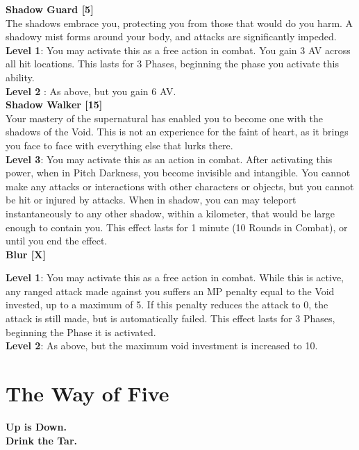 \documentclass[a4paper, twocolumn, openany]{book}
\newlength{\indentlen}
\newcommand{\tabto}[1]{\setlength{\leftskip}{#1\indentlen}}
\begin{document}
{\tabto{0}
{\bfseries\large Shadow Guard [5]\\}
The shadows embrace you, protecting you from those that would do you harm. A shadowy mist
forms around your body, and attacks are significantly impeded.\\

	\tabto{1}
	{\bfseries Level 1}: You may activate this as a free action in combat. You gain 3 AV across all hit
	locations. This lasts for 3 Phases, beginning the phase you activate this ability.\\

		\tabto{2}
		{\bfseries Level 2} : As above, but you gain 6 AV.\\

\tabto{0}
{\bfseries\large Shadow Walker [15]\\}
Your mastery of the supernatural has enabled you to become one with the shadows of the Void.
This is not an experience for the faint of heart, as it brings you face to face with everything else
that lurks there.\\

			\tabto{3}
			{\bfseries Level 3}: You may activate this as an action in combat. After activating this power, when
			in Pitch Darkness, you become invisible and intangible. You cannot make any attacks or
			interactions with other characters or objects, but you cannot be hit or injured by attacks. When
			in shadow, you can may teleport instantaneously to any other shadow, within a kilometer, that
			would be large enough to contain you. This effect lasts for 1 minute (10 Rounds in Combat), or
			until you end the effect.\\

\tabto{0}
{\bfseries\large Blur [X]\\}

	\tabto{1}
	{\bfseries Level 1}: You may activate this as a free action in combat. While this is active, any ranged attack
	made against you suffers an MP penalty equal to the Void invested, up to a maximum of 5. If
	this penalty reduces the attack to 0, the attack is still made, but is automatically failed. This
	effect lasts for 3 Phases, beginning the Phase it is activated.\\

		\tabto{2}
		{\bfseries Level 2}: As above, but the maximum void investment is increased to 10.\\

\tabto{0}

\chapter{The Way of Five}\vspace*{-1.7cm}
{\bfseries\large
\noindent
Up is Down.\\
Drink the Tar.\\

}}
\end{document}
